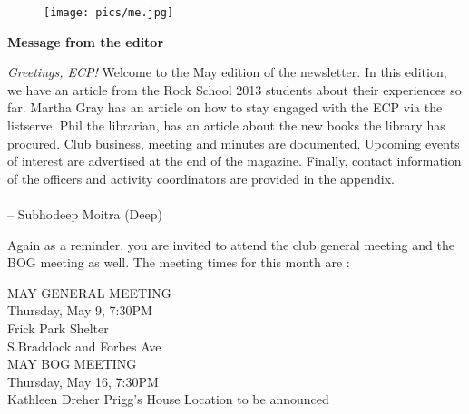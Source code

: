 \documentclass[10pt,a4paper]{article}
\newcommand{\NewsItem}[1]{%
		\usefont{T1}{augie}{m}{n} 	
		\large \bf #1 \vspace{4pt}
		\par \normalsize \normalfont}
\begin{document}
\begin{center}
\begin{minipage}[h]{0.8\linewidth}
	\begin{wrapfigure}{l}{0.41\textwidth}
		\texttt{[image: pics/me.jpg]}
		\\%
	\end{wrapfigure}
	
	\NewsItem{Message from the editor}

	\emph{Greetings, ECP!} Welcome to the May edition of the newsletter. In this edition, we have an article from the Rock School 2013 students about their experiences so far. Martha Gray has an article on how to stay engaged with the ECP via the listserve. Phil the librarian, has an article about the new books the library has procured. Club business, meeting and minutes are documented. Upcoming events of interest are advertised at the end of the magazine. Finally, contact information of the officers and activity coordinators are provided in the appendix. 
\\
\\
-- Subhodeep Moitra (Deep)

\vspace{0.5cm}



	Again as a reminder, you are invited to attend the club general meeting and the BOG meeting as well. The meeting times for this month are :
	
\vspace{1cm}

\begin{multicols}{2}
\Large
MAY GENERAL MEETING\\
Thursday, May 9, 7:30PM\\
Frick Park Shelter\\
S.Braddock and Forbes Ave
\\

MAY BOG MEETING\\
Thursday, May 16, 7:30PM\\
Kathleen Dreher Prigg's House
Location to be announced

\normalsize
\end{multicols}
	
\end{minipage}
\end{center}

\pagebreak
\clearpage
\end{document}
